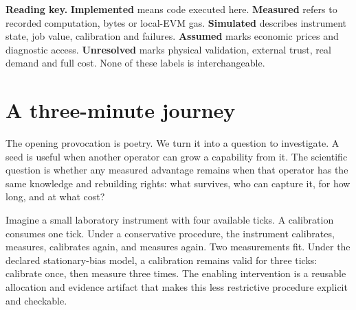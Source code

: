 \documentclass[11pt]{article}
\newcommand{\scope}[1]{\begin{tcolorbox}[colback=light,colframe=nova!35,boxrule=0.5pt,arc=1.5mm,left=2mm,right=2mm,top=1mm,bottom=1mm]#1\end{tcolorbox}}
\begin{document}
\begin{abstract}
Cheaply reproducible intelligence can expand productive possibilities without preserving its inventor's private advantage. We test that distinction in a deliberately tractable synthetic instrument. The constructed capability replaces mandatory recalibration before each occupied measurement tick with valid shared calibration, compiled into an existing finite optimizer and accompanied by independently checkable execution evidence. We predeclare eight conditions, 32 paired seeds and 12 epochs, comparing seven methods over 3,072 worlds and 21,504 method records. The implementation reuses pinned modules from Alpha, Jobs and Fleet; both existing currency-specific native routes are separately exercised on their actually supported mission. \AbstractResults\ A separate local-EVM lifecycle binds six-world pilot evidence to all five Ascension contracts; an off-chain signed registry preserves the studied productive result and evidence-binding functions without claiming equivalent escrow or public consensus. Every physical outcome is simulated, monetary demand and authoring cost remain unmeasured, and no commercial profitability is established. The contribution is an executable, source-bound test of productive value under copying, with negative results and trust boundaries retained.
\end{abstract}

\scope{\textbf{Reading key.} \textbf{Implemented} means code executed here. \textbf{Measured} refers to recorded computation, bytes or local-EVM gas. \textbf{Simulated} describes instrument state, job value, calibration and failures. \textbf{Assumed} marks economic prices and diagnostic access. \textbf{Unresolved} marks physical validation, external trust, real demand and full cost. None of these labels is interchangeable.}

\section{A three-minute journey}
The opening provocation is poetry. We turn it into a question to investigate. A seed is useful when another operator can grow a capability from it. The scientific question is whether any measured advantage remains when that operator has the same knowledge and rebuilding rights: what survives, who can capture it, for how long, and at what cost?

Imagine a small laboratory instrument with four available ticks. A calibration consumes one tick. Under a conservative procedure, the instrument calibrates, measures, calibrates again, and measures again. Two measurements fit. Under the declared stationary-bias model, a calibration remains valid for three ticks: calibrate once, then measure three times. The enabling intervention is a reusable allocation and evidence artifact that makes this less restrictive procedure explicit and checkable.
\end{document}
